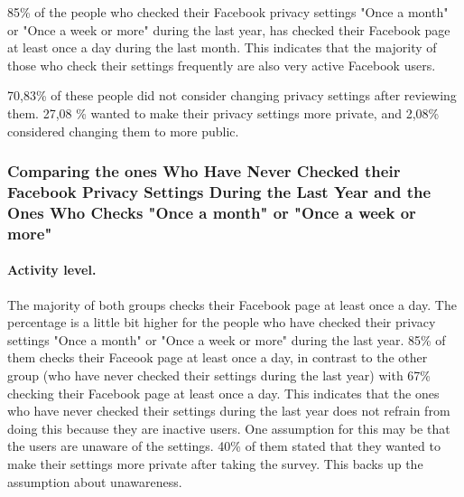 85\% of the people who checked their Facebook privacy settings "Once a month" or "Once a week or more" during the last year, has checked their Facebook page at least once a day during the last month. This indicates that the majority of those who check their settings frequently are also very active Facebook users. 

70,83\% of these people did not consider changing privacy settings after reviewing them. 27,08 \% wanted to make their privacy settings more private, and 2,08\% considered changing them to more public. 




\subsubsection{Comparing the ones Who Have Never Checked their Facebook Privacy Settings During the Last Year and the Ones Who Checks "Once a month" or "Once a week or more"} 

\paragraph{Activity level.}
The majority of both groups checks their Facebook page at least once a day. The percentage is a little bit higher for the people who have checked their privacy settings "Once a month" or "Once a week or more" during the last year. 85\% of them checks their Faceook page at least once a day, in contrast to the other group (who have never checked their settings during the last year) with 67\% checking their Facebook page at least once a day. This indicates that the ones who have never checked their settings during the last year does not refrain from doing this because they are inactive users. One assumption for this may be that the users are unaware of the settings. 40\% of them stated that they wanted to make their settings more private after taking the survey. This backs up the assumption about unawareness.  

